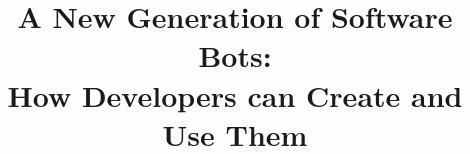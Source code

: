 \documentclass{sig-alternate}
\begin{document}
%

\title{A New Generation of Software Bots:  \\
How Developers can Create and Use Them}




%
%
%
%
%
\end{document}
